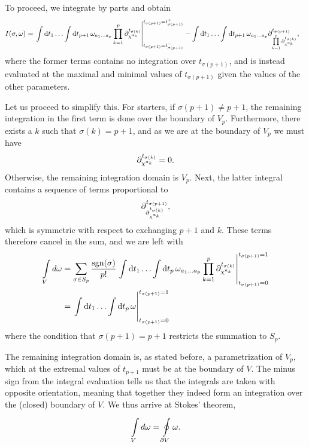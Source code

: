 To proceed, we integrate by parts and obtain
\begin{align*}
	I(\sigma, \omega) &= \eval{\inte{}{}\dd{t_{1}}{\dots \inte{}{}\dd{t_{p + 1}}{\omega_{a_{1}\dots a_{p}}\prod\limits_{k = 1}^{p}\del{t_{\sigma(k)}}{\chi^{a_{k}}}}}}_{t_{\sigma(p + 1)} = t_{\sigma(p + 1)}^{-}}^{t_{\sigma(p + 1)} = t_{\sigma(p + 1)}^{+}} - \inte{}{}\dd{t_{1}}{\dots \inte{}{}\dd{t_{p + 1}}{\omega_{a_{1}\dots a_{p}}\del{t_{\sigma(p + 1)}}{\prod\limits_{k = 1}^{p}\del{t_{\sigma(k)}}{\chi^{a_{k}}}}}},
\end{align*}
where the former terms contains no integration over $t_{\sigma(p + 1)}$, and is instead evaluated at the maximal and minimal values of $t_{\sigma(p + 1)}$ given the values of the other parameters.

Let us proceed to simplify this. For starters, if $\sigma(p + 1) \neq p + 1$, the remaining integration in the first term is done over the boundary of $V_{p}$. Furthermore, there exists a $k$ such that $\sigma(k) = p + 1$, and as we are at the boundary of $V_{p}$ we must have
\begin{align*}
	\partial^{t_{\sigma(k)}}_{\chi^{a_{k}}} = 0.
\end{align*}
Otherwise, the remaining integration domain is $V_{p}$. Next, the latter integral contains a sequence of terms proportional to
\begin{align*}
	\partial^{t_{\sigma(p + 1)}}_{\partial^{t_{\sigma(k)}}_{\chi^{a_{k}}}},
\end{align*}
which is symmetric with respect to exchanging $p + 1$ and $k$. These terms therefore cancel in the sum, and we are left with
\begin{align*}
	\inte{V}{}\df{\omega} &= \sum\limits_{\sigma\in S_{p}}\frac{\text{sgn}(\sigma)}{p!}\eval{\inte{}{}\dd{t_{1}}{\dots \inte{}{}\dd{t_{p}}{\omega_{a_{1}\dots a_{p}}\prod\limits_{k = 1}^{p}\del{t_{\sigma(k)}}{\chi^{a_{k}}}}}}_{t_{\sigma(p + 1)} = 0}^{t_{\sigma(p + 1)} = 1} \\
	                      &= \eval{\inte{}{}\dd{t_{1}}{\dots \inte{}{}\dd{t_{p}}{\omega}}}_{t_{\sigma(p + 1)} = 0}^{t_{\sigma(p + 1)} = 1}
\end{align*}
where the condition that $\sigma(p + 1) = p + 1$ restricts the summation to $S_{p}$.

The remaining integration domain is, as stated before, a parametrization of $V_{p}$, which at the extremal values of $t_{p + 1}$ must be at the boundary of $V$. The minus sign from the integral evaluation tells us that the integrals are taken with opposite orientation, meaning that together they indeed form an integration over the (closed) boundary of $V$. We thus arrive at Stokes' theorem,
\begin{align*}
	\int\limits_{V}^{}d\omega = \oint\limits_{\partial V}\omega.
\end{align*}


